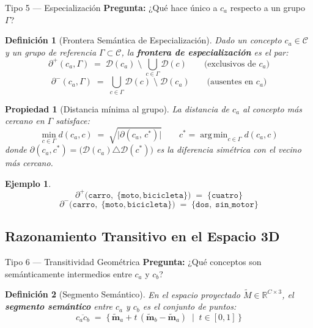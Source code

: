\documentclass[12pt]{article}
\newtheorem{definition}{Definición}[section]
\newtheorem{property}{Propiedad}[section]
\newtheorem{example}{Ejemplo}[section]
\begin{document}
\begin{razonbox}{Tipo 5 — Especialización}
	\textbf{Pregunta:} ¿Qué hace único a $c_a$ respecto a un grupo
	$\Gamma$?
\end{razonbox}

\begin{definition}[Frontera Semántica de Especialización]
	Dado un concepto $c_a \in \mathcal{C}$ y un grupo de referencia
	$\Gamma \subset \mathcal{C}$, la \textbf{frontera de especialización} es el
	par:
	\[
	\partial^+(c_a, \Gamma) \;=\;
	\mathcal{D}(c_a) \;\setminus\; \bigcup_{c \in \Gamma} \mathcal{D}(c)
	\qquad \text{(exclusivos de } c_a\text{)}
	\]
	\[
	\partial^-(c_a, \Gamma) \;=\;
	\bigcup_{c \in \Gamma} \mathcal{D}(c) \;\setminus\; \mathcal{D}(c_a)
	\qquad \text{(ausentes en } c_a\text{)}
	\]
\end{definition}

\begin{property}[Distancia mínima al grupo]
	La distancia de $c_a$ al concepto más cercano en $\Gamma$ satisface:
	\[
	\min_{c \in \Gamma} d(c_a, c)
	\;=\; \sqrt{
		\bigl|\partial(c_a,\, c^*)\bigr|}
	\qquad
	c^* = \operatorname{arg\,min}_{c \in \Gamma} d(c_a, c)
	\]
	donde $\partial(c_a, c^*) = \bigl(\mathcal{D}(c_a) \triangle \mathcal{D}(c^*)\bigr)$
	es la diferencia simétrica con el vecino más cercano.
\end{property}

\begin{example}
	\[
	\partial^+\!\bigl(\texttt{carro},\;
	\{\texttt{moto},\texttt{bicicleta}\}\bigr)
	\;=\; \{\texttt{cuatro}\}
	\]
	\[
	\partial^-\!\bigl(\texttt{carro},\;
	\{\texttt{moto},\texttt{bicicleta}\}\bigr)
	\;=\; \{\texttt{dos},\;\texttt{sin\_motor}\}
	\]
\end{example}

\subsection{Razonamiento Transitivo en el Espacio 3D}

\begin{razonbox}{Tipo 6 — Transitividad Geométrica}
	\textbf{Pregunta:} ¿Qué conceptos son semánticamente intermedios entre
	$c_a$ y $c_b$?
\end{razonbox}

\begin{definition}[Segmento Semántico]
	En el espacio proyectado $\tilde{M} \in \mathbb{R}^{C \times 3}$, el
	\textbf{segmento semántico} entre $c_a$ y $c_b$ es el conjunto de puntos:
	\[
	\overline{c_a c_b} \;=\;
	\bigl\{\,\tilde{\mathbf{m}}_a + t\,
	(\tilde{\mathbf{m}}_b - \tilde{\mathbf{m}}_a)
	\;\mid\; t \in [0,1]\,\bigr\}
	\]
\end{definition}
\end{document}
